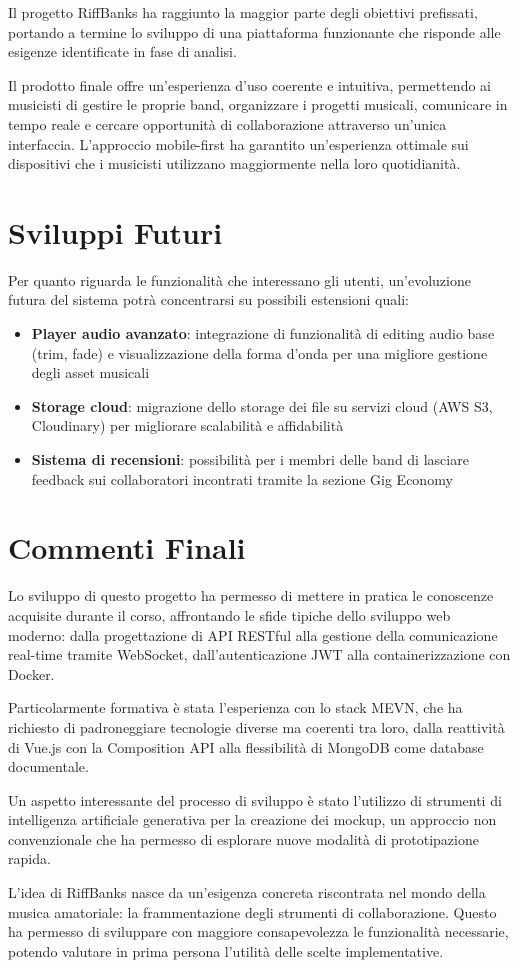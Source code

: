 \documentclass{report}
\begin{document}
Il progetto RiffBanks ha raggiunto la maggior parte degli obiettivi prefissati, portando a termine lo sviluppo di una piattaforma funzionante che risponde alle esigenze identificate in fase di analisi.

Il prodotto finale offre un'esperienza d'uso coerente e intuitiva, permettendo ai musicisti di gestire le proprie band, organizzare i progetti musicali, comunicare in tempo reale e cercare opportunità di collaborazione attraverso un'unica interfaccia. L'approccio mobile-first ha garantito un'esperienza ottimale sui dispositivi che i musicisti utilizzano maggiormente nella loro quotidianità.

\section{Sviluppi Futuri}

Per quanto riguarda le funzionalità che interessano gli utenti, un'evoluzione futura del sistema potrà concentrarsi su possibili estensioni quali:

\begin{itemize}
    \item \textbf{Player audio avanzato}: integrazione di funzionalità di editing audio base (trim, fade) e visualizzazione della forma d'onda per una migliore gestione degli asset musicali
    \item \textbf{Storage cloud}: migrazione dello storage dei file su servizi cloud (AWS S3, Cloudinary) per migliorare scalabilità e affidabilità
    \item \textbf{Sistema di recensioni}: possibilità per i membri delle band di lasciare feedback sui collaboratori incontrati tramite la sezione Gig Economy
\end{itemize}

\section{Commenti Finali}

Lo sviluppo di questo progetto ha permesso di mettere in pratica le conoscenze acquisite durante il corso, affrontando le sfide tipiche dello sviluppo web moderno: dalla progettazione di API RESTful alla gestione della comunicazione real-time tramite WebSocket, dall'autenticazione JWT alla containerizzazione con Docker.

Particolarmente formativa è stata l'esperienza con lo stack MEVN, che ha richiesto di padroneggiare tecnologie diverse ma coerenti tra loro, dalla reattività di Vue.js con la Composition API alla flessibilità di MongoDB come database documentale.

Un aspetto interessante del processo di sviluppo è stato l'utilizzo di strumenti di intelligenza artificiale generativa per la creazione dei mockup, un approccio non convenzionale che ha permesso di esplorare nuove modalità di prototipazione rapida.

L'idea di RiffBanks nasce da un'esigenza concreta riscontrata nel mondo della musica amatoriale: la frammentazione degli strumenti di collaborazione. Questo ha permesso di sviluppare con maggiore consapevolezza le funzionalità necessarie, potendo valutare in prima persona l'utilità delle scelte implementative.
\end{document}
